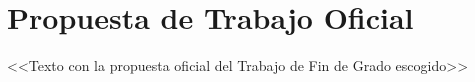 \begin{landscape}

\end{landscape}


\chapter*{Propuesta de Trabajo Oficial}

<<Texto con la propuesta oficial del Trabajo de Fin de Grado escogido>>



